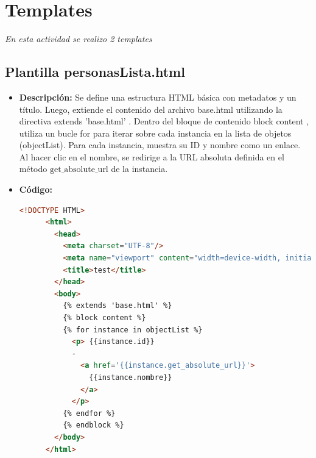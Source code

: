 \documentclass{article}
\begin{document}

  \section{Templates}
  \textit{En esta actividad se realizo 2 templates}
  

  \subsection{Plantilla personasLista.html}
  \begin{itemize}
    \item \textbf{Descripción: } Se define una estructura HTML básica con metadatos y un título. Luego, extiende el contenido del archivo base.html utilizando la directiva 
     extends 'base.html' . Dentro del bloque de contenido block content , utiliza un bucle for para iterar sobre cada 
    instancia en la lista de objetos (objectList). Para cada instancia, muestra su ID y nombre como un enlace. Al hacer clic en el nombre, 
    se redirige a la URL absoluta definida en el método $\text{get\_absolute\_url}$ de la instancia.
    \item \textbf{Código: }
    \begin{lstlisting}[language=html]
      <!DOCTYPE HTML>
      <html>
        <head>
          <meta charset="UTF-8"/>
          <meta name="viewport" content="width=device-width, initial-scale=1.0"/>
          <title>test</title>
        </head>
        <body>
          {% extends 'base.html' %}
          {% block content %}
          {% for instance in objectList %}
            <p> {{instance.id}} 
            - 
              <a href='{{instance.get_absolute_url}}'>
                {{instance.nombre}}
              </a>
            </p>
          {% endfor %}
          {% endblock %}
        </body>
      </html>
    \end{lstlisting}
  \end{itemize}
  
\end{document}
